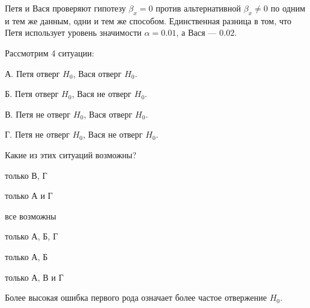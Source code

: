 
\begin{question}
Петя и Вася проверяют гипотезу \(\beta_x=0\) против альтернативной \(\beta_x \neq 0\) по одним и тем же данным,
одни и тем же способом.
Единственная разница в том, что Петя использует уровень значимости \(\alpha = 0.01\), а Вася --- \(0.02\).

Рассмотрим 4 ситуации:

А. Петя отверг \(H_0\), Вася отверг \(H_0\).

Б. Петя отверг \(H_0\), Вася не отверг \(H_0\).

В. Петя не отверг \(H_0\), Вася отверг \(H_0\).

Г. Петя не отверг \(H_0\), Вася не отверг \(H_0\).

Какие из этих ситуаций возможны?
\begin{answerlist}
  \item только В, Г
  \item только А и Г
  \item все возможны
  \item только А, Б, Г
  \item только А, Б
  \item только А, В и Г
\end{answerlist}
\end{question}

\begin{solution}
Более высокая ошибка первого рода означает более частое отвержение \(H_0\).
\end{solution}

